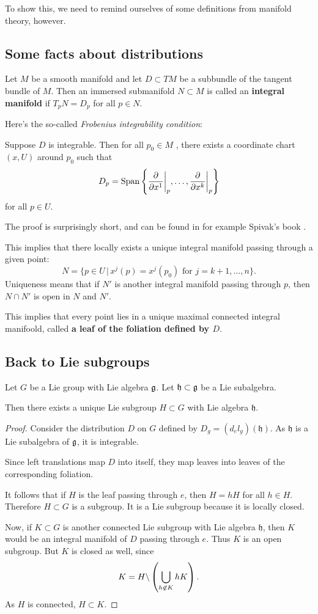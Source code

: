 \documentclass[11pt, english]{article}
\begin{document}
To show this, we need to remind ourselves of some definitions from manifold theory, however.

\subsection{Some facts about distributions}

Let $M$ be a smooth manifold and let $D \subset TM$ be a subbundle of the tangent bundle of $M$. Then an immersed submanifold $N \subset M$ is called an \textbf{integral manifold} if $T_pN = D_p$ for all $p \in N$.

Here's the so-called \emph{Frobenius integrability condition}:

\begin{thm}
Suppose $D$ is integrable. Then for all $p_0 \in M$ , there exists a coordinate chart $(x,U)$ around $p_0$ such that
$$
D_p = \Span \left\{ \restr{\frac{\partial}{\partial x^1}}{p}, \ldots, \restr{\frac{\partial}{\partial x^k}}{p} \right\} 
$$
for all $p \in U$.
\end{thm}
The proof is surprisingly short, and can be found in for example Spivak's book \cite{spivak_manifolds}. 

This implies that there locally exists a unique integral manifold passing through a given point:
$$
N = \{ p \in U \, | \, x^{j}(p) = x^{j}(p_0) \text{ for } j=k+1,\ldots,n \}.
$$
Uniqueness means that if $N'$ is another integral manifold passing through $p$, then $N \cap N'$ is open in $N$ and $N'$. 

This implies that every point lies in a unique maximal connected integral manifoold, called \textbf{a leaf of the foliation defined by $D$}.

\subsection{Back to Lie subgroups}

\begin{thm}
Let $G$ be a Lie group with Lie algebra $\mathfrak g$. Let $\mathfrak h \subset \mathfrak g$ be a Lie subalgebra.

Then there exists a unique Lie subgroup $H \subset G$ with Lie algebra $\mathfrak h$.
\end{thm}
\begin{proof}
  Consider the distribution $D$ on $G$ defined by $D_g = (d_el_g)(\mathfrak h)$. As $\mathfrak h$ is a Lie subalgebra of $\mathfrak g$, it is integrable.

Since left translations map $D$ into itself, they map leaves into leaves of the corresponding foliation. 

It follows that if $H$ is the leaf passing through $e$, then $H=hH$ for all $h \in H$. Therefore $H \subset G$ is a subgroup. It is a Lie subgroup because it is locally closed.

Now, if $K \subset G$ is another connected Lie subgroup with Lie algebra $\mathfrak h$, then $K$ would be an integral manifold of $D$ passing through $e$. Thus $K$ is an open subgroup. But $K$ is closed as well, since
$$
K = H \backslash \left(\bigcup_{h \not \in K} h K\right).
$$
As $H$ is connected, $H \subset K$.
\end{proof}
\end{document}
